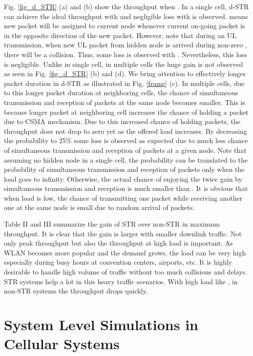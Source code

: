 \documentclass[twocolumn]{IEEEtran}
\begin{document}
Fig. \ref{fig_d_STR} (a) and (b) show the throughput when .
In a single cell, d-STR can achieve the ideal throughput with
 and negligible loss with  is observed. 
means new packet will be assigned to current node whenever current
on-going packet is in the opposite direction of the new packet.
However, note that during an UL transmission, when new UL packet
from hidden node is arrived during non-zero , there will be a
collision. Thus, some loss is observed with . Nevertheless,
this loss is negligible. Unlike in single cell, in multiple cells
the huge gain is not observed as seen in Fig. \ref{fig_d_STR} (b)
and (d). We bring attention to effectively longer packet duration in
d-STR as illustrated in Fig. \ref{frame} (c). In multiple cells, due
to this longer packet duration at neighboring cells, the chance of
simultaneous transmission and reception of packets at the same node
becomes smaller. This is because longer packet at neighboring cell
increases the chance of holding a packet due to CSMA mechanism. Due
to this increased chance of holding packets, the throughput does not
drop to zero yet as the offered load increases. By decreasing the
probability  to 25\% some loss is observed as expected due to
much less chance of simultaneous transmission and reception of
packets at a given node. Note that assuming no hidden node in a
single cell, the probability  can be translated to the
probability of simultaneous transmission and reception of packets
only when the load goes to infinity. Otherwise, the actual chance of
enjoying the twice gain by simultaneous transmission and reception
is much smaller than . It is obvious that when load is low, the
chance of transmitting one packet while receiving another one at the
same node is small due to random arrival of packets.

Table II and III summarize the gain of STR over non-STR in maximum
throughput. It is clear that the gain is larger with smaller
downlink traffic. Not only peak throughput but also the throughput
at high load is important. As WLAN becomes more popular and the
demand grows, the load can be very high especially during busy hours
at convention centers, airports, etc. It is highly desirable to
handle high volume of traffic without too much collisions and
delays. STR systems help a lot in this heavy traffic scenarios. With
high load like , in non-STR systems the throughput drops
quickly.



\section{System Level Simulations in Cellular Systems}
\end{document}
